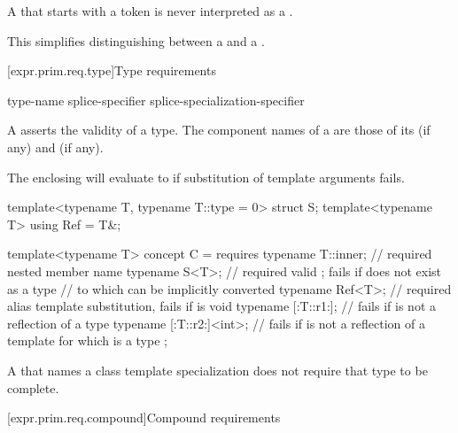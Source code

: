 \pnum
A  that starts with a  token
is never interpreted as a .
\begin{note}
This simplifies distinguishing between a 
and a .
\end{note}

[expr.prim.req.type]{Type requirements}
%

\begin{bnf}
\br
      type-name \terminal{;}\br
     splice-specifier\br
     splice-specialization-specifier
\end{bnf}

\pnum
A  asserts the validity of a type.
The component names of a  are those of its
 (if any) and
 (if any).
\begin{note}
The enclosing  will evaluate to 
if substitution of template arguments fails.
\end{note}
\begin{example}
\begin{codeblock}
template<typename T, typename T::type = 0> struct S;
template<typename T> using Ref = T&;

template<typename T> concept C = requires {
  typename T::inner;        // required nested member name
  typename S<T>;            // required valid ; fails if  does not exist as a type
                            // to which  can be implicitly converted
  typename Ref<T>;          // required alias template substitution, fails if  is void
  typename [:T::r1:];       // fails if  is not a reflection of a type
  typename [:T::r2:]<int>;  // fails if  is not a reflection of a template  for which  is a type
};
\end{codeblock}
\end{example}

\pnum
A  that names a class template specialization
does not require that type to be complete.

[expr.prim.req.compound]{Compound requirements}
%

